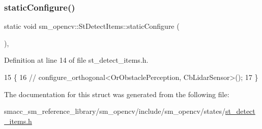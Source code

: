 \subsubsection{\texorpdfstring{static\+Configure()}{staticConfigure()}}
{\footnotesize\ttfamily static void sm\+\_\+opencv\+::\+St\+Detect\+Items\+::static\+Configure (\begin{DoxyParamCaption}{ }\end{DoxyParamCaption})\hspace{0.3cm}{\ttfamily [inline]}, {\ttfamily [static]}}



Definition at line 14 of file st\+\_\+detect\+\_\+items.\+h.


\begin{DoxyCode}
15   \{
16     \textcolor{comment}{//   configure\_orthogonal<OrObstaclePerception, CbLidarSensor>();}
17   \}
\end{DoxyCode}


The documentation for this struct was generated from the following file\+:\begin{DoxyCompactItemize}
\item 
smacc\+\_\+sm\+\_\+reference\+\_\+library/sm\+\_\+opencv/include/sm\+\_\+opencv/states/\hyperlink{include_2sm__opencv_2states_2st__detect__items_8h}{st\+\_\+detect\+\_\+items.\+h}\end{DoxyCompactItemize}
